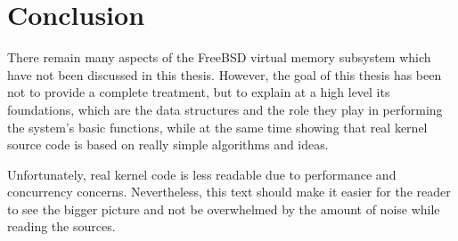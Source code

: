 \documentclass[shortabstract, english]{iithesis}
\begin{document}
\chapter{Conclusion}

There remain many aspects of the FreeBSD virtual memory subsystem which have not
been discussed in this thesis. However, the goal of this thesis has been not to
provide a complete treatment, but to explain at a high level its foundations,
which are the data structures and the role they play in performing the system's
basic functions, while at the same time showing that real kernel source code is
based on really simple algorithms and ideas.

Unfortunately, real kernel code is less readable due to performance and
concurrency concerns. Nevertheless, this text should make it easier for the
reader to see the bigger picture and not be overwhelmed by the amount of noise
while reading the sources.
\end{document}
